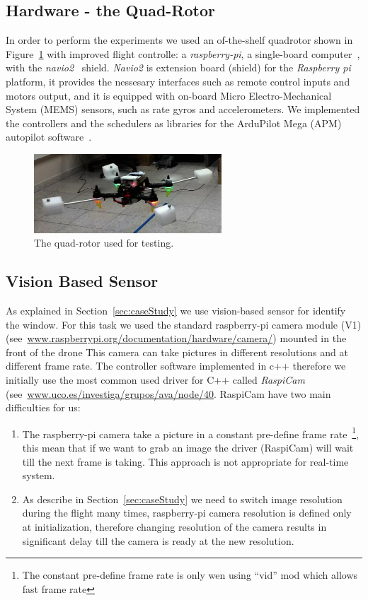 \documentclass[ twoside, 12pt ]{article}
\begin{document}
\subsection{Hardware - the Quad-Rotor}
\label{sec:Experiment setup-HW}

In order to perform the experiments we used an of-the-shelf quadrotor shown in Figure~\ref{fig:the_drone} with improved flight controlle: a \textit{raspberry-pi}, a single-board computer~\cite{raspberry}, with the \textit{navio2}~\cite{navio} shield.
\textit{Navio2} is extension board (shield) for the \textit{Raspberry pi} platform, it provides the nessesary interfaces such as remote control inputs and motors output, and it is equipped with on-board Micro Electro-Mechanical System (MEMS) sensors, such as rate gyros and accelerometers.
We implemented the controllers and the schedulers as libraries for the ArduPilot Mega (APM) autopilot software~\cite{APM}.

\begin{figure} %
    \centerline{\includegraphics[width=70mm]{the_drone.jpg}}
    \caption{The quad-rotor used for testing.}
    \label{fig:the_drone}
\end{figure}

\subsection{Vision Based Sensor}
\label{sec:Experiment setup-cam}
As explained in Section~\ref{sec:caseStudy} we use vision-based sensor for identify the window.
For this task we used the standard raspberry-pi camera module (V1) (see~\url{www.raspberrypi.org/documentation/hardware/camera/}) mounted in the front of the drone
This camera can take pictures in different resolutions and at different frame rate.
The controller software implemented in c++ therefore we initially use the most common used driver for C++ called  \textit{RaspiCam} (see~\url{www.uco.es/investiga/grupos/ava/node/40}.
RaspiCam have two main difficulties for us:
\begin{enumerate}
    \item The raspberry-pi camera take a picture in a constant pre-define frame rate~\footnote{The constant pre-define frame rate is only wen using ``vid'' mod which allows fast frame rate}, this mean that if we want to grab an image the driver (RaspiCam) will wait till the next frame is taking. This approach is not appropriate for real-time system.
    \item As describe in Section~\ref{sec:caseStudy} we need to switch image resolution during the flight many times, raspberry-pi camera resolution is defined only at initialization, therefore changing resolution of the camera results in significant delay till the camera is ready at the new resolution.
\end{enumerate} 
\end{document}
